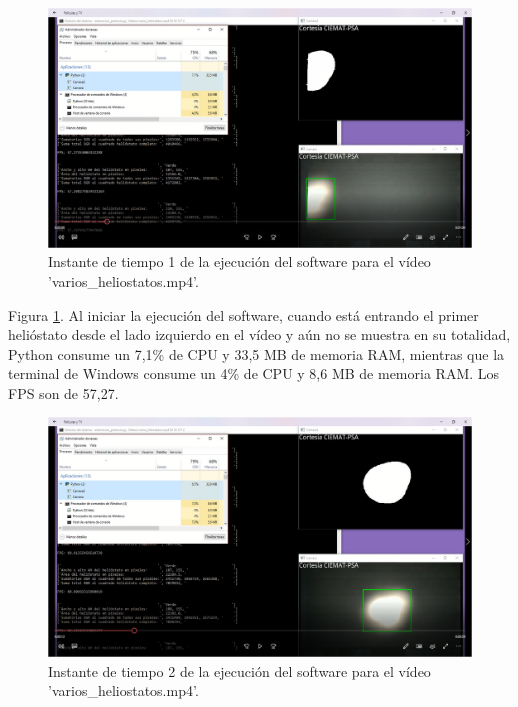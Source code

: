 \begin{figure}[h!]
  	\centering
	\includegraphics[width=\textwidth]{CapturasRendimientoSoftware1/Imagen1.png}
	\caption{Instante de tiempo 1 de la ejecución del software para el vídeo 'varios\_heliostatos.mp4'.
	\label{fig:CapturasRendimientoSoftware1/Imagen1.png}}
\end{figure}

Figura \ref{fig:CapturasRendimientoSoftware1/Imagen1.png}. Al iniciar la ejecución del software, cuando está entrando el primer helióstato desde el lado izquierdo en el vídeo y aún no se muestra en su totalidad, Python consume un 7,1\% de CPU y 33,5 MB de memoria RAM, mientras que la terminal de Windows consume un 4\% de CPU y 8,6 MB de memoria RAM. Los FPS son de 57,27.\\[20pt]

\begin{figure}[h!]
  	\centering
	\includegraphics[width=\textwidth]{CapturasRendimientoSoftware1/Imagen2.png}
	\caption{Instante de tiempo 2 de la ejecución del software para el vídeo 'varios\_heliostatos.mp4'.
	\label{fig:CapturasRendimientoSoftware1/Imagen2.png}}
\end{figure}

